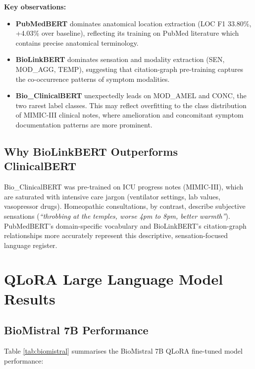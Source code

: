 \textbf{Key observations:}
\begin{itemize}
  \item \textbf{PubMedBERT} dominates anatomical location extraction (LOC F1 33.80\%, +4.03\% over baseline), reflecting its training on PubMed literature which contains precise anatomical terminology.
  \item \textbf{BioLinkBERT} dominates sensation and modality extraction (SEN, MOD\_AGG, TEMP), suggesting that citation-graph pre-training captures the co-occurrence patterns of symptom modalities.
  \item \textbf{Bio\_ClinicalBERT} unexpectedly leads on MOD\_AMEL and CONC, the two rarest label classes. This may reflect overfitting to the class distribution of MIMIC-III clinical notes, where amelioration and concomitant symptom documentation patterns are more prominent.
\end{itemize}

\subsection{Why BioLinkBERT Outperforms ClinicalBERT}

Bio\_ClinicalBERT was pre-trained on ICU progress notes (MIMIC-III), which are saturated with intensive care jargon (ventilator settings, lab values, vasopressor drugs). Homeopathic consultations, by contrast, describe subjective sensations (\textit{``throbbing at the temples, worse 4pm to 8pm, better warmth''}). PubMedBERT's domain-specific vocabulary and BioLinkBERT's citation-graph relationships more accurately represent this descriptive, sensation-focused language register.


\section{QLoRA Large Language Model Results}

\subsection{BioMistral 7B Performance}

Table \ref{tab:biomistral} summarises the BioMistral 7B QLoRA fine-tuned model performance:

